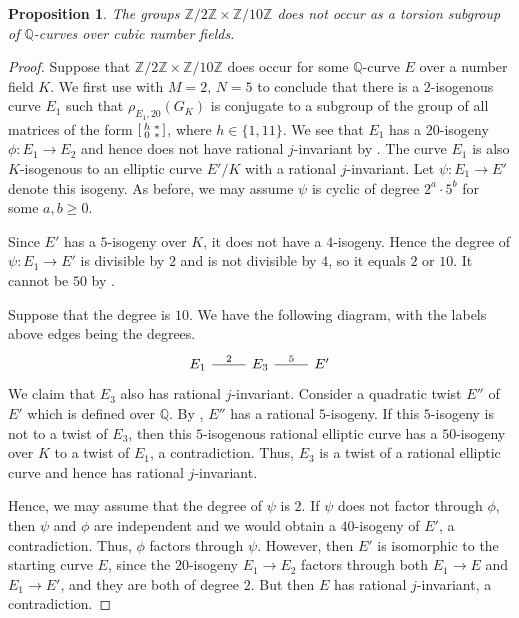 \documentclass[10pt,leqno]{amsart}
\newcommand\sm[1]{\begin{bsmallmatrix}#1\end{bsmallmatrix}}
\newcommand{\Z}{\mathbb{Z}}
\newcommand{\Q}{\mathbb{Q}}
\newtheorem{proposition}[theorem]{Proposition}
\theoremstyle{definition}
\theoremstyle{remark}
\numberwithin{theorem}{section}
\begin{document}
\begin{proposition}\label{eliminiraj2x10}
    The groups $\Z/2\Z \times \Z/10\Z$ does not occur as a torsion subgroup of $\Q$-curves over cubic number fields.
\end{proposition}
\begin{proof}
    Suppose that $\Z/2\Z \times \Z/10\Z$ does occur for some $\Q$-curve $E$ over a number field $K$. We first use  with $M=2$, $N=5$ to conclude that there is a $2$-isogenous curve $E_1$ such that $\rho_{E_1, 20}(G_K)$ is conjugate to a subgroup of the group of all matrices of the form $\sm{h & * \\
    0  & * }$, where $h \in\{1,11\}$. We see that $E_1$ has a $20$-isogeny $\phi: E_1 \to E_2$ and hence does not have rational $j$-invariant by \cite[Theorem 1.2]{ja}. The curve $E_1$ is also $K$-isogenous to an elliptic curve $E'/K$ with a rational $j$-invariant. Let $\psi: E_1 \to E'$ denote this isogeny.  As before, we may assume $\psi$ is cyclic of degree $2^a\cdot 5^b$ for some $a,b \geq 0$.  

    Since $E'$ has a $5$-isogeny over $K$, it does not have a $4$-isogeny. Hence the degree of $\psi: E_1 \to E'$ is divisible by $2$ and is not divisible by $4$, so it equals $2$ or $10$. It cannot be $50$ by \cite[Theorem 1.2]{ja}.

    Suppose that the degree is $10$. We have the following diagram, with the labels above edges being the degrees. \[\begin{tikzcd}
	{E_1} & {E_3} & {E'}
	\arrow["2", no head, from=1-1, to=1-2]
	\arrow["5", no head, from=1-2, to=1-3]
\end{tikzcd}\]
We claim that $E_3$ also has rational $j$-invariant.  Consider a quadratic twist $E''$ of $E'$ which is defined over $\Q$. By , $E''$ has a rational $5$-isogeny. If this $5$-isogeny is not to a twist of $E_3$, then this $5$-isogenous rational elliptic curve has a $50$-isogeny over $K$ to a twist of $E_1$, a contradiction. Thus, $E_3$ is a twist of a rational elliptic curve and hence has rational $j$-invariant. 

Hence, we may assume that the degree of $\psi$ is $2$. If $\psi$ does not factor through $\phi$, then $\psi$ and $\phi$ are independent and we would obtain a $40$-isogeny of $E'$, a contradiction. Thus, $\phi$ factors through $\psi$. However, then $E'$ is isomorphic to the starting curve $E$, since the $20$-isogeny $E_1 \to E_2$ factors through both $E_1 \to E$ and $E_1 \to E'$, and they are both of degree $2$. But then $E$ has rational $j$-invariant, a contradiction.
\end{proof}
\end{document}

